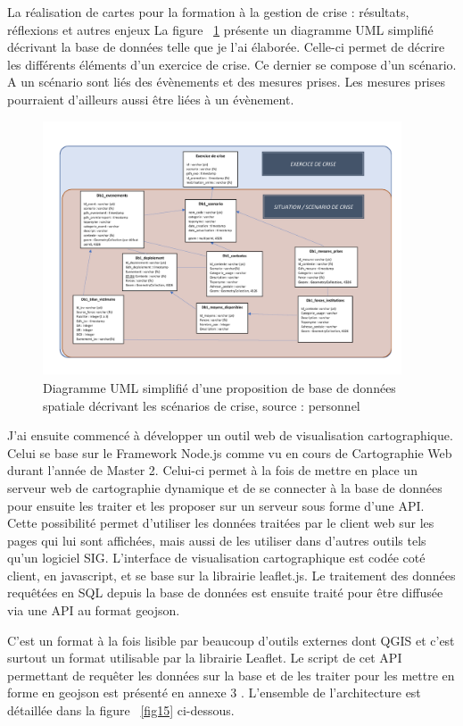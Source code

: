 \documentclass[10pt,a4paper]{report} %
\begin{document}
\begin{part}{La réalisation de cartes pour la formation à la gestion de crise : résultats, réflexions et autres enjeux}
La figure ~\ref{fig14} présente un diagramme UML simplifié décrivant la base de données telle que je l’ai élaborée. Celle-ci permet de décrire les différents éléments d’un exercice de crise. Ce dernier se compose d’un scénario. A un scénario sont liés des évènements et des mesures prises. Les mesures prises pourraient d’ailleurs aussi être liées à un évènement. 
\begin{figure}[!b]
    \centering
    \includegraphics[width=0.95\textwidth]{figures/uml.png}
    \caption{Diagramme UML simplifié d’une proposition de base de données spatiale décrivant les scénarios de crise, source : personnel}
    \label{fig14}
\end{figure}
J’ai ensuite commencé à développer un outil web de visualisation cartographique. Celui se base sur le Framework Node.js comme vu en cours de Cartographie Web durant l’année de Master 2. Celui-ci permet à la fois de mettre en place un serveur web de cartographie dynamique et de se connecter à la base de données pour ensuite les traiter et les proposer sur un serveur sous forme d’une API. Cette possibilité permet d’utiliser les données traitées par le client web sur les pages qui lui sont affichées, mais aussi de les utiliser dans d’autres outils tels qu’un logiciel SIG. L’interface de visualisation cartographique est codée coté client, en javascript, et se base sur la librairie leaflet.js. Le traitement des données requêtées en SQL depuis la base de données est ensuite traité pour être diffusée via une API au format geojson. 

C’est un format à la fois lisible par beaucoup d’outils externes dont QGIS et c’est surtout un format utilisable par la librairie Leaflet. Le script de cet API permettant de requêter les données sur la base et de les traiter pour les mettre en forme en geojson est présenté en annexe 3 . L’ensemble de l’architecture est détaillée dans la figure ~\ref{fig15} ci-dessous. 


\end{part}
\end{document}
